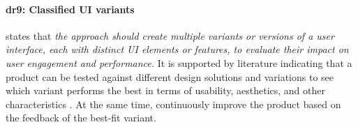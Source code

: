 
\paragraph*{\ac{dr}9: Classified UI variants} states that \textit{the approach should create multiple variants or versions of a user interface, each with distinct UI elements or features, to evaluate their impact on user engagement and performance.}
It is supported by literature indicating that a product can be tested against different design solutions and variations \cite{article:CE:fitzgerald} to see which variant performs the best in terms of usability, aesthetics, and other characteristics \cite{article:controlled:experiements}. 
At the same time, continuously improve \cite{article:CE:ros} the product based on the feedback of the best-fit variant.


